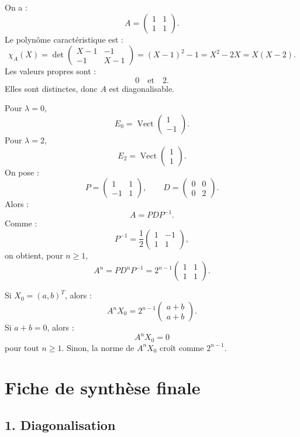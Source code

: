 \documentclass[11pt,a4paper]{article}
\newcommand{\Vect}{\operatorname{Vect}}
\begin{document}
On a :
\[
A=
\begin{pmatrix}
1&1\\
1&1
\end{pmatrix}.
\]
Le polynôme caractéristique est :
\[
\chi_A(X)=
\det
\begin{pmatrix}
X-1&-1\\
-1&X-1
\end{pmatrix}
=
(X-1)^2-1
=
X^2-2X
=
X(X-2).
\]
Les valeurs propres sont :
\[
0
\quad\text{et}\quad
2.
\]
Elles sont distinctes, donc \(A\) est diagonalisable.

Pour \(\lambda=0\),
\[
E_0=\Vect
\begin{pmatrix}
1\\-1
\end{pmatrix}.
\]
Pour \(\lambda=2\),
\[
E_2=\Vect
\begin{pmatrix}
1\\1
\end{pmatrix}.
\]
On pose :
\[
P=
\begin{pmatrix}
1&1\\
-1&1
\end{pmatrix},
\qquad
D=
\begin{pmatrix}
0&0\\
0&2
\end{pmatrix}.
\]
Alors :
\[
A=PDP^{-1}.
\]
Comme :
\[
P^{-1}=
\frac12
\begin{pmatrix}
1&-1\\
1&1
\end{pmatrix},
\]
on obtient, pour \(n\geq1\),
\[
A^n=PD^nP^{-1}
=
2^{n-1}
\begin{pmatrix}
1&1\\
1&1
\end{pmatrix}.
\]

Si \(X_0=(a,b)^T\), alors :
\[
A^nX_0
=
2^{n-1}
\begin{pmatrix}
a+b\\
a+b
\end{pmatrix}.
\]
Si \(a+b=0\), alors :
\[
A^nX_0=0
\]
pour tout \(n\geq1\).  
Sinon, la norme de \(A^nX_0\) croît comme \(2^{n-1}\).

\newpage
\section{Fiche de synthèse finale}

\subsection*{1. Diagonalisation}
\end{document}
